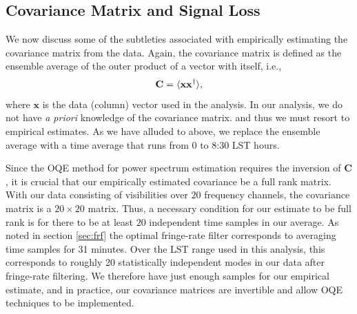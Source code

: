 \documentclass[twocolumn,numberedappendix]{emulateapj} \shorttitle{PSA64}
\newcommand{\x}{\mathbf{x}} \newcommand{\xhat}{\hat{\mathbf{x}}}
\newcommand{\C}{\mathbf{C}} \newcommand{\Q}{\mathbf{Q}}
\begin{document}
\subsection{Covariance Matrix and Signal Loss}
\label{sec:sigloss}
%

We now discuss some of the subtleties associated with empirically estimating the covariance matrix from
the data. Again, the covariance matrix is defined as the ensemble average of the outer
product of a vector with itself, i.e., 
\begin{equation}
    \C = \expval{\x\x^{\dagger}}, 
\end{equation}
where $\x$ is the data (column) vector used in the analysis. In our analysis,
we do not have \emph{a priori} knowledge of the covariance matrix. and thus we
must resort to empirical estimates. As we have alluded to above, we replace
the ensemble average with a time average that runs from 0 to 8:30 LST hours.

Since the OQE method for power spectrum estimation requires the inversion
of $\C$, it is crucial that our empirically estimated covariance be a full rank matrix.
With our data consisting of visibilities over $20$ frequency channels, the covariance
matrix is a $20 \times 20$ matrix. Thus, a necessary condition for our estimate to be
full rank is for there to be at least $20$ independent time samples in our average. As noted in section \ref{sec:frf} the optimal fringe-rate
filter corresponds to averaging time samples for 31 minutes. Over the LST range
used in this analysis, this corresponds to roughly 20 statistically
independent modes in our data after fringe-rate filtering. We therefore have just enough
samples for our empirical estimate, and in practice, our covariance matrices are invertible
and allow OQE techniques to be implemented.
\end{document}
